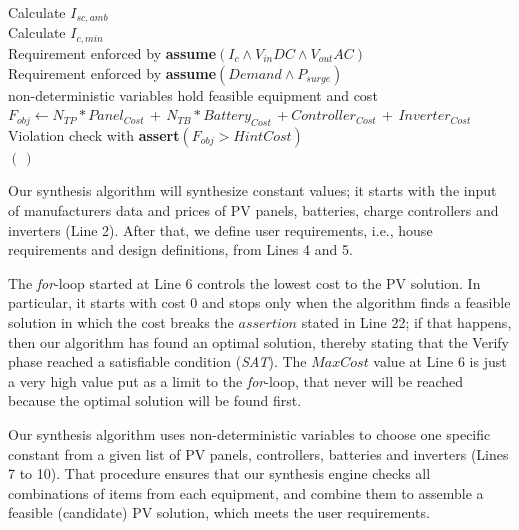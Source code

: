 \documentclass[10pt,conference]{IEEEtran}
\begin{document}
\begin{algorithm}
\begin{algorithmic}[1]
\begin{scriptsize}
 	\STATE Calculate $I_{sc,amb}$ \\
 	\STATE Calculate $I_{c,min}$ \\
 	\STATE Requirement enforced by \textbf{assume}$(I_{c} \wedge V_{in}DC \wedge V_{out}AC)$ \\
	\STATE Requirement enforced by \textbf{assume}$(Demand \wedge P_{surge})$ \\
	\STATE non-deterministic variables hold feasible equipment and cost  \\
	\STATE $F_{obj} \leftarrow  N_{TP}*Panel_{Cost} \, + \, N_{TB}*Battery_{Cost} \, + Controller_{Cost} \, + \, Inverter_{Cost}$ \\
	\STATE Violation check with \textbf{assert}$(F_{obj} > HintCost)$ \\
  \ENDFOR
 \RETURN $(\,)$ 
  \end{scriptsize}
 \end{algorithmic} 
 \label{alg:verification-algorithm}
 \end{algorithm}
%

Our synthesis algorithm will synthesize constant values; it starts with the input of manufacturers data and prices of PV panels, batteries, charge controllers and inverters (Line 2). After that, we define user requirements, i.e., house requirements and design definitions, from Lines 4 and 5. 

The \textit{for}-loop started at Line 6 controls the lowest cost to the PV solution. In particular, it starts with cost $0$ and stops only when the algorithm finds a feasible solution in which the cost breaks the $assertion$ stated in Line 22; if that happens, then our algorithm has found an optimal solution, thereby stating that the {\sc Verify} phase reached a satisfiable condition (\textit{SAT}). The $MaxCost$ value at Line 6 is just a very high value put as a limit to the \textit{for}-loop, that never will be reached because the optimal solution will be found first.

Our synthesis algorithm uses non-deterministic variables to choose one specific constant from a given list of PV panels, controllers, batteries and inverters (Lines 7 to 10). That procedure ensures that our synthesis engine checks all combinations of items from each equipment, and combine them to assemble a feasible (candidate) PV solution, which meets the user requirements.
\end{document}
